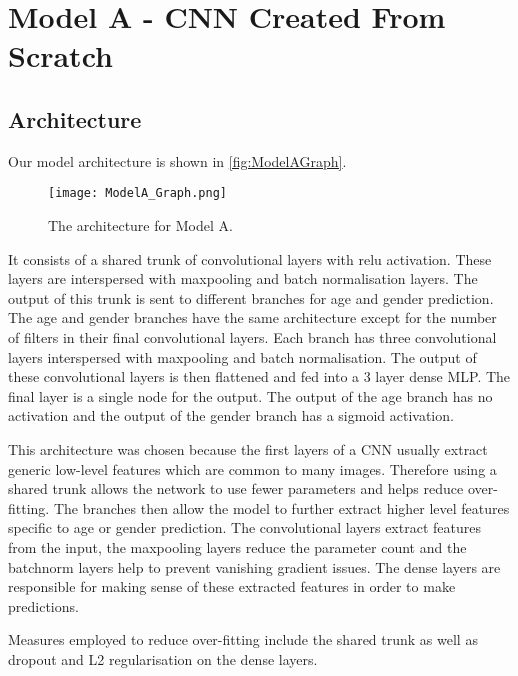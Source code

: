 \section{Model A - CNN Created From Scratch}
\subsection{Architecture}
Our model architecture is shown in \autoref{fig:ModelAGraph}.
\begin{figure}[h!]
    \centering
    \texttt{[image: ModelA\_Graph.png]}
    \caption{The architecture for Model A.}
    \label{fig:ModelAGraph}
\end{figure}

It consists of a shared trunk of convolutional layers with relu activation. These layers are interspersed with maxpooling and batch normalisation layers.  
The output of this trunk is sent to different branches for age and gender prediction. 
The age and gender branches have the same architecture except for the number of filters in their final convolutional layers. 
Each branch has three convolutional layers interspersed with maxpooling and batch normalisation. 
The output of these convolutional layers is then flattened and fed into a 3 layer dense MLP. The final layer is a single node for the output. The output of the age branch has no activation and the output of the gender branch has a sigmoid activation. 


This architecture was chosen because the first layers of a CNN usually extract generic low-level features which are common to many images. 
Therefore using a shared trunk allows the network to use fewer parameters and helps reduce over-fitting.
The branches then allow the model to further extract higher level features specific to age or gender prediction. 
The convolutional layers extract features from the input, the maxpooling layers reduce the parameter count and the batchnorm layers help to prevent vanishing gradient issues. The dense layers are responsible for making sense of these extracted features in order to make predictions.

Measures employed to reduce over-fitting include the shared trunk as well as dropout and L2 regularisation on the dense layers.


